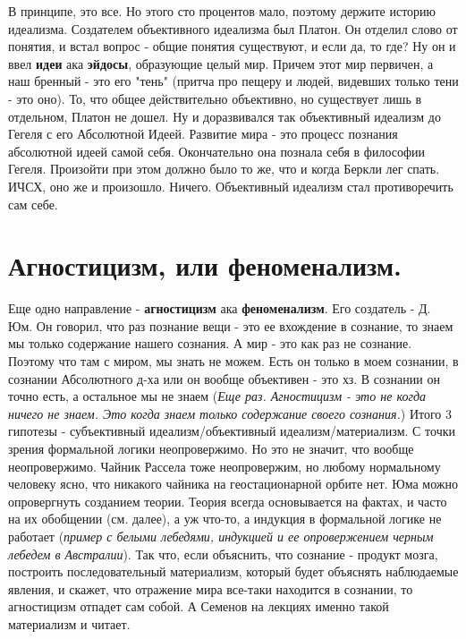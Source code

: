 В принципе, это все. Но этого сто процентов мало, поэтому держите историю идеализма. Создателем объективного идеализма был Платон. Он отделил слово от понятия, и встал вопрос - общие понятия существуют, и если да, то где? Ну он и ввел \textbf{идеи} ака \textbf{эйдосы}, образующие целый мир. Причем этот мир первичен, а наш бренный - это его "тень" (притча про пещеру и людей, видевших только тени - это оно). То, что общее действительно объективно, но существует лишь в отдельном, Платон не дошел. Ну и доразвивался так объективный идеализм до Гегеля с его Абсолютной Идеей. Развитие мира - это процесс познания абсолютной идеей самой себя. Окончательно она познала себя в философии Гегеля. Произойти при этом должно было то же, что и когда Беркли лег спать. ИЧСХ, оно же и произошло. Ничего. Объективный идеализм стал противоречить сам себе.

\section{ Агностицизм, или феноменализм.}
Еще одно направление - \textbf{агностицизм} ака \textbf{феноменализм}. Его создатель - Д. Юм. Он говорил, что раз познание вещи - это ее вхождение в сознание, то знаем мы только содержание нашего сознания. А мир - это как раз не сознание. Поэтому что там с миром, мы знать не можем. Есть он только в моем сознании, в сознании Абсолютного д-ха или он вообще объективен - это хз. В сознании он точно есть, а остальное мы не знаем (\textit{Еще раз. Агностицизм - это не когда ничего не знаем. Это когда знаем только содержание своего сознания.}) Итого 3 гипотезы - субъективный идеализм/объективный идеализм/материализм. С точки зрения формальной логики неопровержимо. Но это не значит, что вообще неопровержимо. Чайник Рассела тоже неопровержим, но любому нормальному человеку ясно, что никакого чайника на геостационарной орбите нет. Юма можно опровергнуть созданием теории. Теория всегда основывается на фактах, и часто на их обобщении (см. далее), а уж что-то, а индукция в формальной логике не работает (\textit{пример с белыми лебедями, индукцией и ее опровержением черным лебедем в Австралии}). Так что, если объяснить, что сознание - продукт мозга, построить последовательный материализм, который будет объяснять наблюдаемые явления, и скажет, что отражение мира все-таки находится в сознании, то агностицизм отпадет сам собой. А Семенов на лекциях именно такой материализм и читает. 

